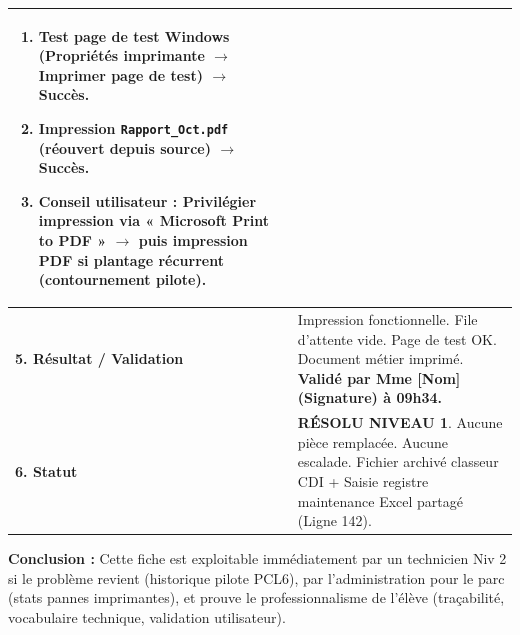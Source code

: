 \documentclass[11pt]{article}
\newcommand{\cle}[1]{{\popxbold\color{popdark}#1}}
\begin{document}
\begin{exoresolu}
\begin{center}
\begin{tabularx}{\linewidth}{|l|X|}
\begin{enumerate}
    \item Test page de test Windows (Propriétés imprimante $\rightarrow$ Imprimer page de test) $\rightarrow$ \textbf{Succès}.
    \item Impression \texttt{Rapport\_Oct.pdf} (réouvert depuis source) $\rightarrow$ \textbf{Succès}.
    \item Conseil utilisateur : Privilégier impression via « Microsoft Print to PDF » $\rightarrow$ puis impression PDF si plantage récurrent (contournement pilote).
\end{enumerate} \\
\hline
\textbf{5. Résultat / Validation} & Impression fonctionnelle. File d'attente vide. Page de test OK. Document métier imprimé. \textbf{Validé par Mme [Nom] (Signature) à 09h34.} \\
\hline
\textbf{6. Statut} & \textbf{\cle{RÉSOLU NIVEAU 1}}. Aucune pièce remplacée. Aucune escalade. Fichier archivé classeur CDI + Saisie registre maintenance Excel partagé (Ligne 142). \\
\hline
\end{tabularx}
\end{center}

\textbf{Conclusion :} Cette fiche est exploitable immédiatement par un technicien Niv 2 si le problème revient (historique pilote PCL6), par l'administration pour le parc (stats pannes imprimantes), et prouve le professionnalisme de l'élève (traçabilité, vocabulaire technique, validation utilisateur).
\end{exoresolu}
\end{document}
